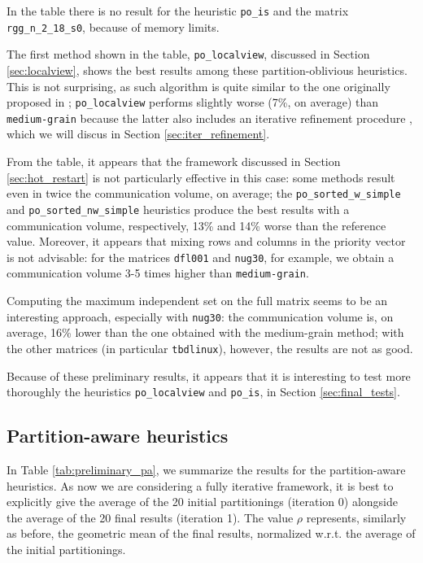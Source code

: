 In the table there is no result for the heuristic \verb|po_is| and the  matrix \verb|rgg_n_2_18_s0|, because of memory limits.

The first method shown in the table, \verb|po_localview|, discussed in Section \ref{sec:localview}, shows the best results among these partition-oblivious heuristics. This is not surprising, as such algorithm is quite similar to the one originally proposed in \cite{mediumgrain}; \verb|po_localview| performs slightly worse (7\%, on average) than \verb|medium-grain| because the latter also includes an iterative refinement procedure \cite[Section 3.3]{mediumgrain}, which we will discus in Section \ref{sec:iter_refinement}.

From the table, it appears that the framework discussed in Section \ref{sec:hot_restart} is not particularly effective in this case: some methods result even in twice the communication volume, on average; the \verb|po_sorted_w_simple| and \verb|po_sorted_nw_simple| heuristics produce the best results with a communication volume, respectively, 13\% and 14\% worse than the reference value. Moreover, it appears that mixing rows and columns in the priority vector is not advisable: for the matrices \verb|dfl001| and \verb|nug30|, for example, we obtain a communication volume 3-5 times higher than \verb|medium-grain|. 

Computing the maximum independent set on the full matrix seems to be an interesting approach, especially with \verb|nug30|: the communication volume is, on average, 16\% lower than the one obtained with the medium-grain method; with the other matrices (in particular \verb|tbdlinux|), however, the results are not as good.

Because of these preliminary results, it appears that it is interesting to test more thoroughly the heuristics \verb|po_localview| and \verb|po_is|, in Section \ref{sec:final_tests}.

\subsection{Partition-aware heuristics} \label{sec:preliminary_pa}

In Table \ref{tab:preliminary_pa}, we summarize the results for the partition-aware heuristics. As now we are considering a fully iterative framework, it is best to explicitly give the average of the 20 initial partitionings (iteration 0) alongside the average of the 20 final results (iteration 1). The value $\rho$ represents, similarly as before, the geometric mean of the final results, normalized w.r.t. the average of the initial partitionings. 

